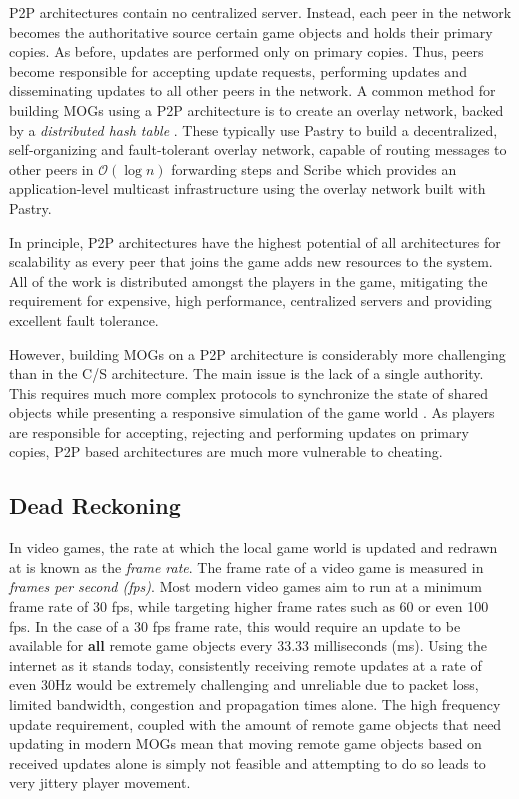 P2P architectures contain no centralized server. Instead, each peer in the network becomes the authoritative source certain game objects and holds their primary copies. As before, updates are performed only on primary copies. Thus, peers become responsible for accepting update requests, performing updates and disseminating updates to all other peers in the network. A common method for building MOGs using a P2P architecture is to create an overlay network, backed by a \textit{distributed hash table} \cite{p2p-mog-dht}. These typically use Pastry to build a decentralized, self-organizing and fault-tolerant overlay network, capable of routing messages to other peers in $\mathcal{O}(\log{}n)$ forwarding steps \cite{pastry} and Scribe \cite{scribe} which provides an application-level multicast infrastructure using the overlay network built with Pastry.

In principle, P2P architectures have the highest potential of all architectures for scalability as every peer that joins the game adds new resources to the system. All of the work is distributed amongst the players in the game, mitigating the requirement for expensive, high performance, centralized servers and providing excellent fault tolerance. 

However, building MOGs on a P2P architecture is considerably more challenging than in the C/S architecture. The main issue is the lack of a single authority. This requires much more complex protocols to synchronize the state of shared objects while presenting a responsive simulation of the game world \cite{dead-reckoning}. As players are responsible for accepting, rejecting and performing updates on primary copies, P2P based architectures are much more vulnerable to cheating. 

\subsection{Dead Reckoning}\label{sec:sota:dead-reckoning}
In video games, the rate at which the local game world is updated and redrawn at is known as the \textit{frame rate}. The frame rate of a video game is measured in \textit{frames per second (fps)}. Most modern video games aim to run at a minimum frame rate of 30 fps, while targeting higher frame rates such as 60 or even 100 fps. In the case of a 30 fps frame rate, this would require an update to be available for \textbf{all} remote game objects every 33.33 milliseconds (ms). Using the internet as it stands today, consistently receiving remote updates at a rate of even 30Hz would be extremely challenging and unreliable due to packet loss, limited bandwidth, congestion and propagation times alone. The high frequency update requirement, coupled with the amount of remote game objects that need updating in modern MOGs mean that moving remote game objects based on received updates alone is simply not feasible and attempting to do so leads to very jittery player movement.

